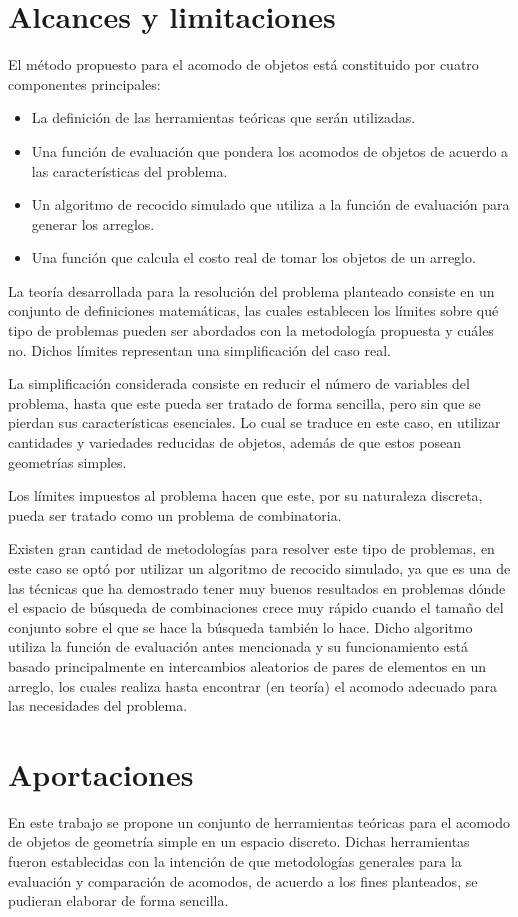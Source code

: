 \section{Alcances y limitaciones}
%
%
El método propuesto para el acomodo de objetos está constituido por cuatro componentes principales:
%
\begin{itemize}
	\item La definición de las herramientas teóricas que serán utilizadas.
	\item Una función de evaluación que pondera los acomodos de objetos de acuerdo a las características del problema.
	\item Un algoritmo de recocido simulado que utiliza a la función de evaluación para generar los arreglos.
	\item Una función que calcula el costo real de tomar los objetos de un arreglo.
\end{itemize}
%
La teoría desarrollada para la resolución del problema planteado consiste en un conjunto de definiciones matemáticas, las cuales establecen los límites sobre qué tipo de problemas pueden ser abordados con la metodología propuesta y cuáles no.
Dichos límites representan una simplificación del caso real.

La simplificación considerada consiste en reducir el número de variables del problema, hasta que este pueda ser tratado de forma sencilla, pero sin que se pierdan sus características esenciales.
Lo cual se traduce en este caso, en utilizar cantidades y variedades reducidas de objetos, además de que estos posean geometrías simples.

Los límites impuestos al problema hacen que este, por su naturaleza discreta, pueda ser tratado como un problema de combinatoria.

Existen gran cantidad de metodologías para resolver este tipo de problemas, en este caso se optó por utilizar un algoritmo de recocido simulado, ya que es una de las técnicas que ha demostrado tener muy buenos resultados en problemas dónde el espacio de búsqueda de combinaciones crece muy rápido cuando el tamaño del conjunto sobre el que se hace la búsqueda también lo hace.
Dicho algoritmo utiliza la función de evaluación antes mencionada y su funcionamiento está basado principalmente en intercambios aleatorios de pares de elementos en un arreglo, los cuales realiza hasta encontrar (en teoría) el acomodo adecuado para las necesidades del problema.
%
%
\section{Aportaciones}
%
%
En este trabajo se propone un conjunto de herramientas teóricas para el acomodo de objetos de geometría simple en un espacio discreto.
Dichas herramientas fueron establecidas con la intención de que metodologías generales para la evaluación y comparación de acomodos, de acuerdo a los fines planteados, se pudieran elaborar de forma sencilla.

